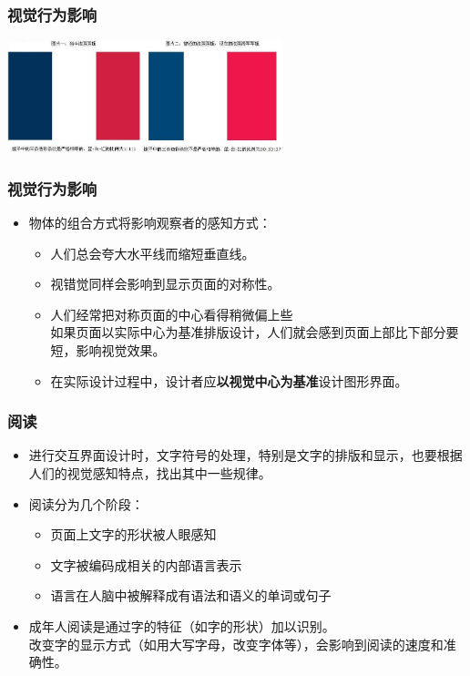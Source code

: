 \documentclass{beamer}
\begin{document}
\begin{frame}
	\frametitle{视觉行为影响}
	\transwipe
	\begin{center}
	\includegraphics[width=8cm]{images/flag_comparison.jpg}
	\end{center}
\end{frame}

\begin{frame}
	\frametitle{视觉行为影响}
	\beamertemplatetransparentcovereddynamicmedium
	\begin{itemize}
		\item 物体的组合方式将影响观察者的感知方式：
		\begin{itemize}[<+->]
			\item 人们总会夸大水平线而缩短垂直线。
			\item 视错觉同样会影响到显示页面的对称性。
			\item 人们经常把对称页面的中心看得稍微偏上些\\{\tiny 如果页面以实际中心为基准排版设计，人们就会感到页面上部比下部分要短，影响视觉效果}。
			\item 在实际设计过程中，设计者应\textbf{以视觉中心为基准}设计图形界面。
		\end{itemize}
	\end{itemize}
\end{frame}


\begin{frame}
	\frametitle{阅读}
	\beamertemplatetransparentcovereddynamicmedium
	\begin{itemize}
		\item 进行交互界面设计时，文字符号的处理，特别是文字的排版和显示，也要根据人们的视觉感知特点，找出其中一些规律。\pause
		\item 阅读分为几个阶段：
		\begin{itemize}
			\item 页面上文字的形状被人眼感知
			\item 文字被编码成相关的内部语言表示
			\item 语言在人脑中被解释成有语法和语义的单词或句子
		\end{itemize}\pause
		\item 成年人阅读是通过字的特征（如字的形状）加以识别。\\{\tiny 改变字的显示方式（如用大写字母，改变字体等），会影响到阅读的速度和准确性。}
	\end{itemize}
\end{frame}
\end{document}
